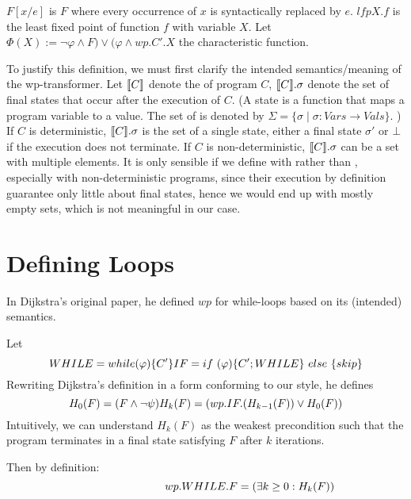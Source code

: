 $F[x/e]$ is $F$ where every occurrence of $x$ is syntactically replaced by $e$. 
$lfp X. f$ is the least fixed point of function $f$ with variable $X$. 
Let $\Phi(X):=\neg\varphi\wedge F)\vee(\varphi\wedge wp.C'.X$ the characteristic function. 

To justify this definition, we must first clarify the intended semantics/meaning of the wp-transformer. 
Let $\llbracket {C} \rrbracket$ denote the  of program $C$, $\llbracket {C} \rrbracket.\sigma$ denote the set of final states that  occur after the execution of $C$. 
(A state is a function that maps a program variable to a value. The set of  is denoted by $\Sigma=\{\sigma \mid \sigma: Vars\to Vals\}$. )
If $C$ is deterministic, $\llbracket {C} \rrbracket.\sigma$ is the set of a single state, either a final state $\sigma'$ or $\bot$ if the execution does not terminate. 
If $C$ is non-deterministic, $\llbracket {C} \rrbracket.\sigma$ can be a set with multiple elements. 
It is only sensible if we define with  rather than , especially with non-deterministic programs, since their execution by definition  guarantee only little about final states, hence we would end up with mostly empty sets, which is not meaningful in our case. 



\section{Defining Loops}
In Dijkstra's original paper\cite{Dijkstra1975}, he defined $wp$ for while-loops based on its (intended) semantics. 

Let 
\[
WHILE=while(\varphi)\{C'\}
\\ 
IF=  if\ (\varphi)\{C';WHILE\}\ else\ \{skip\}
\] 
Rewriting Dijkstra's definition in a form conforming to our style, he defines 
\[
H_0(F)=(F \wedge \neg \psi )
\\
H_k(F)=(wp.IF.(H_{k-1}(F)) \vee H_0(F))
\]
Intuitively, we can understand $H_k(F)$ as the weakest precondition such that the program terminates in a final state satisfying $F$ after  $k$ iterations. 

Then by definition: 
\begin{equation}
\hspace{2.8cm} wp.WHILE.F=(\exists k\geq 0: H_k(F))  \label{eq:while}
\end{equation}




